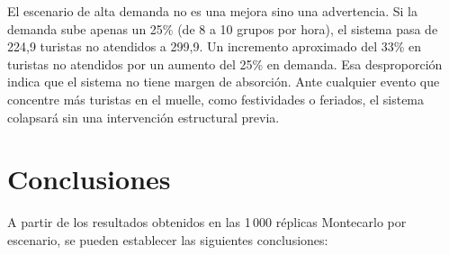 \documentclass[12pt,a4paper]{article}
\begin{document}
El escenario de alta demanda no es una mejora sino una advertencia.
Si la demanda sube apenas un 25\% (de 8 a 10 grupos por hora), el
sistema pasa de 224,9 turistas no atendidos a 299,9. Un incremento
aproximado del 33\% en turistas no atendidos por un aumento del 25\% en demanda.
Esa desproporción indica que el sistema no tiene margen de absorción.
Ante cualquier evento que concentre más turistas en el muelle, como
festividades o feriados, el sistema colapsará sin una intervención
estructural previa.

\section{Conclusiones}

A partir de los resultados obtenidos en las 1\,000 réplicas Montecarlo
por escenario, se pueden establecer las siguientes conclusiones:
\end{document}
